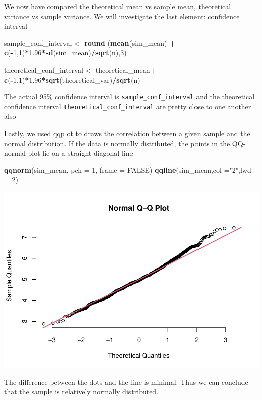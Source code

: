 \documentclass[
]{article}
\newenvironment{Shaded}{\begin{snugshade}}{\end{snugshade}}
\newcommand{\DataTypeTok}[1]{\textcolor[rgb]{0.13,0.29,0.53}{#1}}
\newcommand{\DecValTok}[1]{\textcolor[rgb]{0.00,0.00,0.81}{#1}}
\newcommand{\FloatTok}[1]{\textcolor[rgb]{0.00,0.00,0.81}{#1}}
\newcommand{\KeywordTok}[1]{\textcolor[rgb]{0.13,0.29,0.53}{\textbf{#1}}}
\newcommand{\NormalTok}[1]{#1}
\newcommand{\OperatorTok}[1]{\textcolor[rgb]{0.81,0.36,0.00}{\textbf{#1}}}
\newcommand{\OtherTok}[1]{\textcolor[rgb]{0.56,0.35,0.01}{#1}}
\newcommand{\StringTok}[1]{\textcolor[rgb]{0.31,0.60,0.02}{#1}}
\begin{document}
We now have compared the theoretical mean vs sample mean, theoretical
variance vs sample variance. We will investigate the last element:
confidence interval

\begin{Shaded}
\begin{Highlighting}[]
\NormalTok{sample_conf_interval <-}\StringTok{ }\KeywordTok{round}\NormalTok{ (}\KeywordTok{mean}\NormalTok{(sim_mean) }\OperatorTok{+}\StringTok{ }\KeywordTok{c}\NormalTok{(}\OperatorTok{-}\DecValTok{1}\NormalTok{,}\DecValTok{1}\NormalTok{)}\OperatorTok{*}\FloatTok{1.96}\OperatorTok{*}\KeywordTok{sd}\NormalTok{(sim_mean)}\OperatorTok{/}\KeywordTok{sqrt}\NormalTok{(n),}\DecValTok{3}\NormalTok{)}


\NormalTok{theoretical_conf_interval <-}\StringTok{ }\NormalTok{theoretical_mean}\OperatorTok{+}\StringTok{ }\KeywordTok{c}\NormalTok{(}\OperatorTok{-}\DecValTok{1}\NormalTok{,}\DecValTok{1}\NormalTok{)}\OperatorTok{*}\FloatTok{1.96}\OperatorTok{*}\KeywordTok{sqrt}\NormalTok{(theoretical_var)}\OperatorTok{/}\KeywordTok{sqrt}\NormalTok{(n)}
\end{Highlighting}
\end{Shaded}

The actual 95\% confidence interval is \texttt{sample\_conf\_interval}
and the theoretical confidence interval
\texttt{theoretical\_conf\_interval} are pretty close to one another
also

Lastly, we used qqplot to draws the correlation between a given sample
and the normal distribution. If the data is normally distributed, the
points in the QQ-normal plot lie on a straight diagonal line

\begin{Shaded}
\begin{Highlighting}[]
\KeywordTok{qqnorm}\NormalTok{(sim_mean, }\DataTypeTok{pch =} \DecValTok{1}\NormalTok{, }\DataTypeTok{frame =} \OtherTok{FALSE}\NormalTok{)}
\KeywordTok{qqline}\NormalTok{(sim_mean,}\DataTypeTok{col =}\StringTok{"2"}\NormalTok{,}\DataTypeTok{lwd =} \DecValTok{2}\NormalTok{)}
\end{Highlighting}
\end{Shaded}

\includegraphics{StatisticalInference_Project_Week4_files/figure-latex/unnamed-chunk-13-1.pdf}

The difference between the dots and the line is minimal. Thus we can
conclude that the sample is relatively normally distributed.
\end{document}
